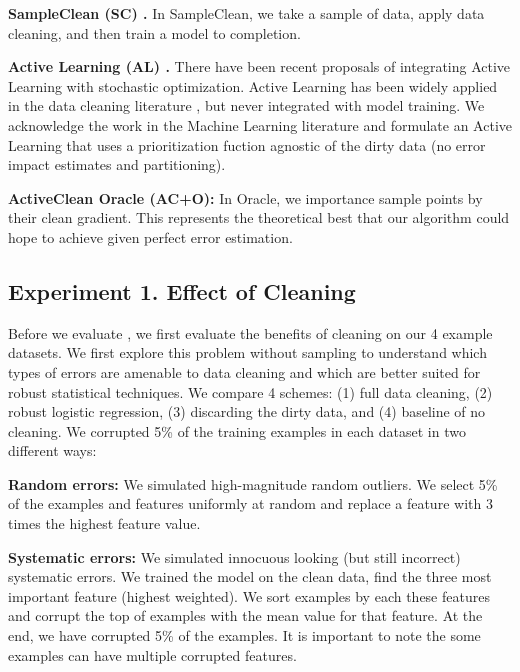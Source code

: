 \vspace{0.5em}

\noindent\textbf{SampleClean (SC) \cite{wang1999sample}. } In SampleClean, we take a sample of data, apply data cleaning, and then train a model to completion.

\vspace{0.5em}

\noindent\textbf{Active Learning (AL) \cite{guillory2009active}. } There have been recent proposals of integrating Active Learning with stochastic optimization. Active Learning has been widely applied in the data cleaning literature \cite{gokhale2014corleone}, but never integrated with model training. We acknowledge the work in the Machine Learning literature and formulate an Active Learning that uses a prioritization fuction agnostic of the dirty data (no error impact estimates and partitioning). 

\vspace{0.5em}

\noindent\textbf{ActiveClean Oracle (AC+O): } In \sys Oracle, we importance sample points by their clean gradient. This represents the theoretical best that our algorithm could hope to achieve given perfect error estimation.

\subsection{Experiment 1. Effect of Cleaning}
Before we evaluate \sys, we first evaluate the benefits of cleaning on our 4 example datasets.
We first explore this problem without sampling to understand which types of errors are amenable to data cleaning and which are better suited for robust statistical techniques.
We compare 4 schemes: (1) full data cleaning, (2) robust logistic regression, (3) discarding the dirty data, and (4) baseline of no cleaning. We corrupted 5\% of the training examples in each dataset in two different ways:

\vspace{0.5em}

\noindent\textbf{Random errors: } We simulated high-magnitude random outliers. We select 5\% of the examples and features uniformly at random and replace a feature with 3 times the highest feature value.

\vspace{0.5em}

\noindent\textbf{Systematic errors: } We simulated innocuous looking (but still incorrect) systematic errors. We trained the model on the clean data, find the three most important feature (highest weighted). We sort examples by each these features and corrupt the top of examples with the mean value for that feature. 
At the end, we have corrupted 5\% of the examples.
It is important to note the some examples can have multiple corrupted features.

